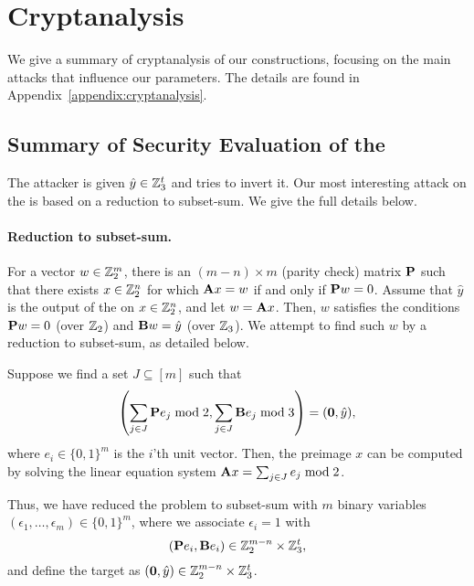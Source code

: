 \section{Cryptanalysis}
\label{sec:cryptanalysis}

We give a summary of cryptanalysis of our constructions,
focusing on the main attacks that influence our parameters.
The details are found in Appendix~\ref{appendix:cryptanalysis}.


\subsection{Summary of Security Evaluation of the \ttOWF}

The attacker is given $\hat{y} \in \mathbb{Z}_3^t$ and tries to invert it.
Our most interesting attack on the \ttOWF is based on a reduction to subset-sum.
We give the full details below.

\paragraph{Reduction to subset-sum.}
For a vector $w \in \mathbb{Z}_2^m$, there is an $(m -n) \times m$ (parity check) matrix $\mat{P}$ such that there exists $x \in \mathbb{Z}_2^n$ for which $\mat{A}x = w$ if and only if $\mat{P} w=0$.
Assume that $\hat{y}$ is the output of the \ttOWF on $x \in \mathbb{Z}_2^n$, and let $w = \mat{A}x$. Then,
$w$ satisfies the conditions $\mat{P} w = 0$ (over $\mathbb{Z}_2$) and $\mat{B}w = \hat{y}$ (over $\mathbb{Z}_3$).
We attempt to find such $w$ by a reduction to subset-sum, as detailed below.

Suppose we find a set $J \subseteq [m]$ such that
$$\left( \sum_{j \in J} \mat{P}e_j  \bmod 2, \sum_{j \in J} \mat{B}e_j  \bmod 3 \right) = (\vec{0},\hat{y}),$$
where $e_i \in \{0,1\}^m$ is the $i$'th unit vector.
Then, the preimage $x$ can be computed by solving the linear equation system
$\mat{A}x = \sum_{j \in J} e_j  \bmod 2$.

Thus, we have reduced the problem to subset-sum with $m$ binary variables
$(\epsilon_1, \ldots, \epsilon_m) \in \{0,1\}^m$, where we associate $\epsilon_i = 1$
with $$(\mat{P}e_i, \mat{B}e_i) \in \Z_2^{m-n} \times \Z_3^t,$$
and define the target
as $(\vec{0},\hat{y}) \in \Z_2^{m-n} \times \Z_3^t$.

